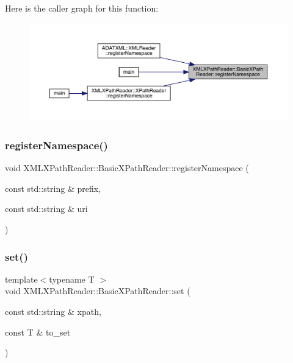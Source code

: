 Here is the caller graph for this function\+:
\nopagebreak
\begin{figure}[H]
\begin{center}
\leavevmode
\includegraphics[width=350pt]{d6/dbf/classXMLXPathReader_1_1BasicXPathReader_a6c6d6e977694344a70506a24bebe853d_icgraph}
\end{center}
\end{figure}
\mbox{\label{classXMLXPathReader_1_1BasicXPathReader_a5991605f4cda926b146829be5798b037}} 
\subsubsection{\texorpdfstring{registerNamespace()}{registerNamespace()}\hspace{0.1cm}{\footnotesize\ttfamily [3/3]}}
{\footnotesize\ttfamily void X\+M\+L\+X\+Path\+Reader\+::\+Basic\+X\+Path\+Reader\+::register\+Namespace (\begin{DoxyParamCaption}\item[{const std\+::string \&}]{prefix,  }\item[{const std\+::string \&}]{uri }\end{DoxyParamCaption})}

\mbox{\label{classXMLXPathReader_1_1BasicXPathReader_a4cf7407f107bf4f307b70af4cccbd30e}} 
\subsubsection{\texorpdfstring{set()}{set()}\hspace{0.1cm}{\footnotesize\ttfamily [1/3]}}
{\footnotesize\ttfamily template$<$typename T $>$ \\
void X\+M\+L\+X\+Path\+Reader\+::\+Basic\+X\+Path\+Reader\+::set (\begin{DoxyParamCaption}\item[{const std\+::string \&}]{xpath,  }\item[{const T \&}]{to\+\_\+set }\end{DoxyParamCaption})\hspace{0.3cm}{\ttfamily [inline]}}

